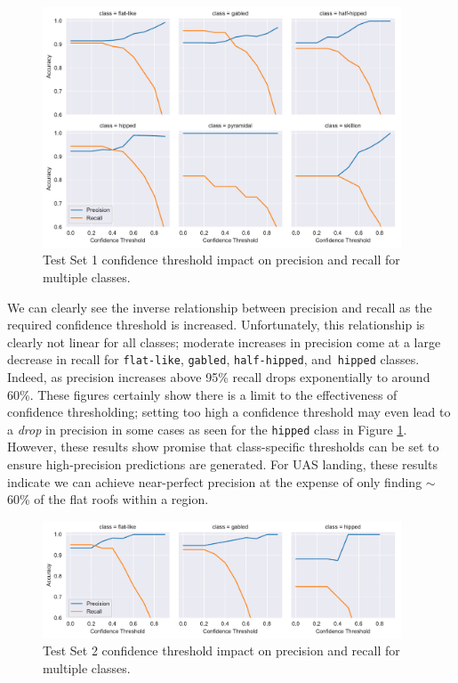 \begin{figure}[h]
\centering
\includegraphics[width=0.95\textwidth]{chapter_4_roofshape/imgs/metrics_threshold_collapseflat.pdf}
\caption{Test Set 1 confidence threshold impact on precision and recall for multiple classes.}
\label{fig:confidence_combined_collapseflat}
\end{figure}

We can clearly see the inverse relationship between precision and recall as the required confidence threshold is increased. Unfortunately, this relationship is clearly not linear for all classes; moderate increases in precision come at a large decrease in recall for \texttt{flat-like}, \texttt{gabled}, \texttt{half-hipped}, and~\texttt{hipped} classes. Indeed, as precision increases above 95\% recall drops exponentially to around 60\%.  These figures certainly show there is a limit to the effectiveness of confidence thresholding; setting too high a confidence threshold may even lead to a \emph{drop} in precision in some cases as seen for the \texttt{hipped} class in Figure \ref{fig:confidence_combined_collapseflat}. However, these results show promise that class-specific thresholds can be set to ensure high-precision predictions are generated.  For UAS landing, these results indicate we can achieve near-perfect precision at the expense of only finding $\sim$60\% of the flat roofs within a region.

\begin{figure}[h]
\centering
\includegraphics[width=0.95\textwidth]{chapter_4_roofshape/imgs/metrics_threshold_collapseflat_aa.pdf}
\caption{Test Set 2 confidence threshold impact on precision and recall for multiple classes.}
\label{fig:confidence_aa_collapseflat}
\end{figure}


